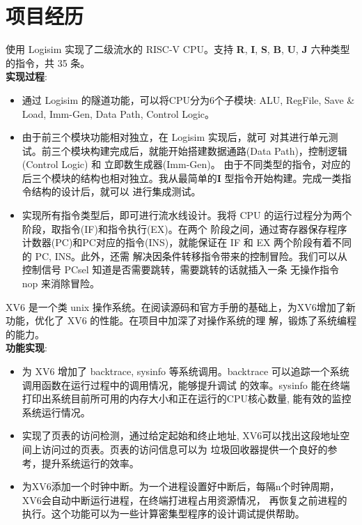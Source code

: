 \documentclass{resume}
\begin{document}
\section{项目经历}
  使用 Logisim 实现了二级流水的 RISC-V CPU。支持 \textbf{R}, \textbf{I}, \textbf{S}, 
    \textbf{B}, \textbf{U}, \textbf{J} 六种类型的指令，共 35 条。 
 \\   \textbf{实现过程}:  
  \begin{itemize}
    \item 通过 Logisim 的隧道功能，可以将CPU分为6个子模块: ALU, RegFile,  
    Save \& Load, Imm-Gen, Data Path, Control Logic。
    \item 由于前三个模块功能相对独立，在 Logisim 实现后，就可
    对其进行单元测试。前三个模块构建完成后，就能开始搭建数据通路(Data Path)，控制逻辑(Control Logic) 和 立即数生成器(Imm-Gen)。
    由于不同类型的指令，对应的后三个模块的结构也相对独立。我从最简单的\textbf{I} 型指令开始构建。完成一类指令结构的设计后，就可以
    进行集成测试。 
    \item 实现所有指令类型后，即可进行流水线设计。我将 CPU 的运行过程分为两个阶段，取指令(IF)和指令执行(EX)。在两个
    阶段之间，通过寄存器保存程序计数器(PC)和PC对应的指令(INS)，就能保证在 IF 和 EX 两个阶段有着不同的 PC, INS。此外，还需
    解决因条件转移指令带来的控制冒险。我们可以从控制信号 PCsel 知道是否需要跳转，需要跳转的话就插入一条 无操作指令 nop 来消除冒险。 

\end{itemize}

  XV6 是一个类 unix 操作系统。在阅读源码和官方手册的基础上，为XV6增加了新功能，优化了 XV6 的性能。在项目中加深了对操作系统的理
  解，锻炼了系统编程的能力。
 \\   \textbf{功能实现}:  
\begin{itemize}
 \item 为 XV6 增加了 backtrace, sysinfo 等系统调用。backtrace 可以追踪一个系统调用函数在运行过程中的调用情况，能够提升调试
 的效率。sysinfo 能在终端打印出系统目前所可用的内存大小和正在运行的CPU核心数量, 能有效的监控系统运行情况。
 \item 实现了页表的访问检测，通过给定起始和终止地址, XV6可以找出这段地址空间上访问过的页表。页表的访问信息可以为
 垃圾回收器提供一个良好的参考，提升系统运行的效率。
 \item 为XV6添加一个时钟中断。为一个进程设置好中断后，每隔n个时钟周期，XV6会自动中断运行进程，在终端打进程占用资源情况，
 再恢复之前进程的执行。这个功能可以为一些计算密集型程序的设计调试提供帮助。
\end{itemize}
\end{document}
